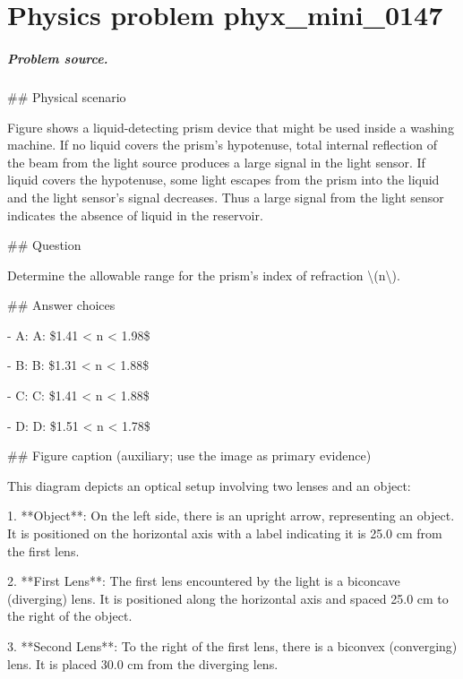 
\chapter{Physics problem phyx\_mini\_0147}
\label{ch:PhyXMiniProblems_problem_phyx_mini_0147}

\paragraph{Problem source.}
\#\# Physical scenario

Figure shows a liquid-detecting prism device that might be used inside a washing machine. If no liquid covers the prism's hypotenuse, total internal reflection of the beam from the light source produces a large signal in the light sensor. If liquid covers the hypotenuse, some light escapes from the prism into the liquid and the light sensor's signal decreases. Thus a large signal from the light sensor indicates the absence of liquid in the reservoir.

\#\# Question

Determine the allowable range for the prism's index of refraction \textbackslash{}(n\textbackslash{}).

\#\# Answer choices

- A: A: \$1.41 < n < 1.98\$

- B: B: \$1.31 < n < 1.88\$

- C: C: \$1.41 < n < 1.88\$

- D: D: \$1.51 < n < 1.78\$

\#\# Figure caption (auxiliary; use the image as primary evidence)

This diagram depicts an optical setup involving two lenses and an object:

1. **Object**: On the left side, there is an upright arrow, representing an object. It is positioned on the horizontal axis with a label indicating it is 25.0 cm from the first lens.

2. **First Lens**: The first lens encountered by the light is a biconcave (diverging) lens. It is positioned along the horizontal axis and spaced 25.0 cm to the right of the object. 

3. **Second Lens**: To the right of the first lens, there is a biconvex (converging) lens. It is placed 30.0 cm from the diverging lens.

